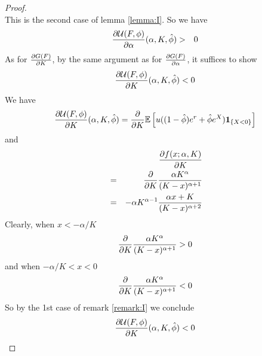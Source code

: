 \documentclass[11pt,a4]{amsart}
\newcommand{\pd}{\partial}
\newcommand{\E }{{\mathbb E}}
\newcommand{\1}{{\mathbf 1}}
\begin{document}
\begin{proof}
\[  \]
  This is the second case of lemma \ref{lemma:I}. So we have
  \begin{eqnarray*}
    {\pd \mathcal U(F, \phi) \over \pd \alpha}(\alpha, K, \hat\phi) &>& 0
  \end{eqnarray*}
  As for ${\pd G(F) \over \pd K}$, by the same argument as for
  ${\pd G(F) \over \pd \alpha}$, it suffices to show
  \[
  {\pd \mathcal U(F, \phi) \over \pd K}(\alpha, K, \hat\phi) < 0
  \]
  We have
  \[
  {\pd \mathcal U(F, \phi) \over \pd K}(\alpha, K, \hat\phi)
  = {\partial \over \partial K} \E \left[
    u((1 - \hat\phi) e^r + \hat\phi e^X) \1_{\{X < 0\}}
  \right] 
  \]
  and
  \begin{eqnarray*}
    && {\pd f(x; \alpha, K) \over \pd K} \\
    &=& {\partial \over \partial K} {\alpha K^\alpha \over (K - x)^{\alpha + 1}} \\
    &=&
    -\alpha K^{\alpha - 1} {
      \alpha x + K
      \over
      (K - x)^{\alpha + 2}
    }
  \end{eqnarray*}
  Clearly, when $x < -\alpha/K$
  \[
  {\partial \over \partial K} {\alpha K^\alpha \over (K - x)^{\alpha + 1}} > 0
  \]
  and when $-\alpha/K < x < 0$
  \[
  {\partial \over \partial K} {\alpha K^\alpha \over (K - x)^{\alpha + 1}} < 0
  \]
  So by the 1st case of remark \ref{remark:I} we conclude
  \[
  {\pd \mathcal U(F, \phi) \over \pd K}(\alpha, K, \hat\phi) < 0  
  \]
\end{proof}



\end{document}
